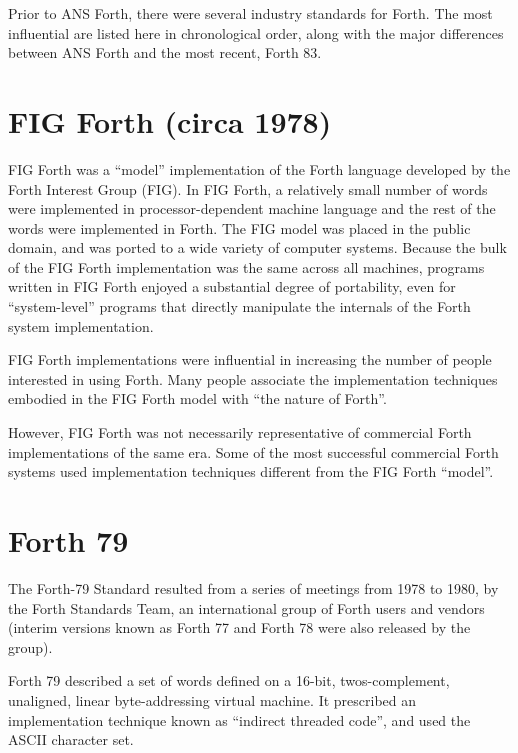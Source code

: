 \label{annex:diff}

Prior to ANS Forth, there were several industry standards for Forth.
The most influential are listed here in chronological order, along
with the major differences between ANS Forth and the most recent,
Forth 83.

\section{FIG Forth (circa 1978)} %

FIG Forth was a ``model'' implementation of the Forth language
developed by the Forth Interest Group (FIG). In FIG Forth, a
relatively small number of words were implemented in processor-dependent
machine language and the rest of the words were implemented in Forth.
The FIG model was placed in the public domain, and was ported to a
wide variety of computer systems. Because the bulk of the FIG Forth
implementation was the same across all machines, programs written in
FIG Forth enjoyed a substantial degree of portability, even for
``system-level'' programs that directly manipulate the internals of
the Forth system implementation.

FIG Forth implementations were influential in increasing the number
of people interested in using Forth. Many people associate the
implementation techniques embodied in the FIG Forth model with
``the nature of Forth''.

However, FIG Forth was not necessarily representative of commercial
Forth implementations of the same era. Some of the most successful
commercial Forth systems used implementation techniques different
from the FIG Forth ``model''.


\section{Forth 79} %

The Forth-79 Standard resulted from a series of meetings from 1978
to 1980, by the Forth Standards Team, an international group of Forth
users and vendors (interim versions known as Forth 77 and Forth 78
were also released by the group).

Forth 79 described a set of words defined on a 16-bit, twos-complement,
unaligned, linear byte-addressing virtual machine. It prescribed an
implementation technique known as ``indirect threaded code'', and used
the ASCII character set.

